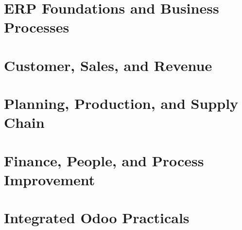\documentclass[11pt,oneside,a4paper]{report}
\begin{document}
\utpfrontmatter



\part{ERP Foundations and Business Processes}



\part{Customer, Sales, and Revenue}



\part{Planning, Production, and Supply Chain}




\part{Finance, People, and Process Improvement}




\part{Integrated Odoo Practicals}












\end{document}
